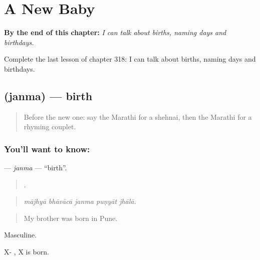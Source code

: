 
\chapter{A New Baby}
\label{ch:mr-a-new-baby}

\begin{chapteropening}
\textbf{By the end of this chapter:} \emph{I can talk about births, naming days and birthdays.}

Complete the last lesson of chapter 318: I can talk about births, naming days and birthdays.
\end{chapteropening}

\section[\texorpdfstring{\mr{जन्म} (janma)}{जन्म (janma)}]{ (janma) — birth}

\label{lesson:MR-C318-janma}



\begin{quote}
Before the new one: say the Marathi for a shehnai, then the Marathi for a rhyming couplet.
\end{quote}

\subsection*{You'll want to know: }
\textbf{} — \emph{janma} — \textquotedblleft{}birth\textquotedblright{}.

\begin{quote}
    .
\end{quote}

\begin{quote}
\emph{mājhyā bhāvācā janma puṇyāt jhālā.}
\end{quote}

\begin{quote}
My brother was born in Pune.
\end{quote}

Masculine.

X-  , X is born.

